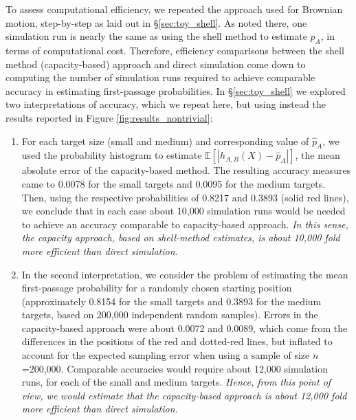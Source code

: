 \documentclass[12pt, nofootinbib,english, amsmath, amssymb, aps, priprint, graphicx,floatfix]{revtex4-1}
\theoremstyle{plain}
\theoremstyle{definition}
\theoremstyle{plain}
\begin{document}
{To assess computational efficiency, we repeated the approach used for Brownian motion, step-by-step as laid out in \S\ref{sec:toy_shell}.
As noted there, one simulation run is nearly the same as using the shell method to estimate $p_A$, in terms of computational cost. 
Therefore, efficiency comparisons between the shell method (capacity-based) approach
and direct simulation come down to computing the number of simulation runs required to achieve comparable accuracy in estimating first-passage probabilities. In \S\ref{sec:toy_shell} we explored two interpretations of accuracy, which we repeat here, but using instead the results reported in Figure \ref{fig:results_nontrivial}:
\begin{enumerate}
\item 
For each target size (small and medium) and corresponding value
of $\hat{p}_A$, we used the probability histogram to estimate  $\mathbb{E}[| h_{A,B}(X) - \hat{p}_A |]$, the mean absolute error of the capacity-based method. The resulting accuracy measures came to 0.0078 for the small targets and 0.0095 for the medium targets. Then, using the respective probabilities of 0.8217 and 0.3893 (solid red lines), we conclude that in each case about 10,000 simulation runs would be needed to achieve an accuracy comparable to capacity-based approach. {\em In this sense, the capacity approach, based on shell-method estimates, is about 10,000 fold more efficient than direct simulation.}
\item
In the second interpretation, we consider the problem of estimating the mean first-passage probability for a randomly chosen starting position (approximately 0.8154 for the small targets and 0.3893 for the medium targets, based on 200,000 independent random samples). Errors in the capacity-based approach were about 0.0072 and 0.0089, which come from the differences in the positions of the red and dotted-red lines, but inflated to account for 
the expected sampling error when using a sample of size $n$=200,000.
Comparable accuracies would require about 12,000 simulation runs, for each of the small and medium targets. {\em Hence, from this point of view,  we would estimate that the capacity-based approach is about 12,000 fold more efficient than direct simulation.}
\end{enumerate}








}
\end{document}
